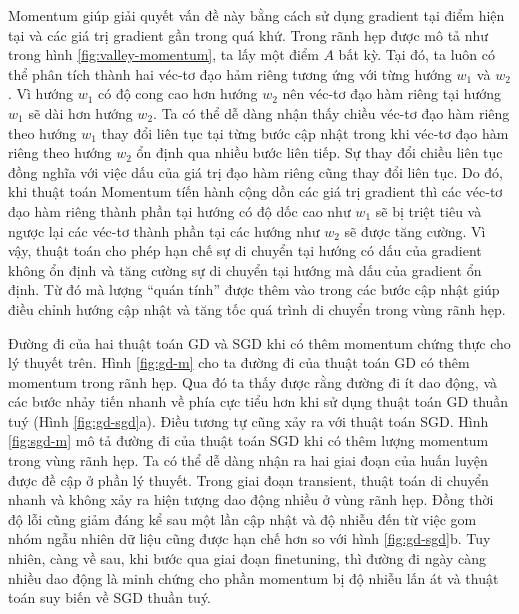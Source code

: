 Momentum giúp giải quyết vấn đề này bằng cách sử dụng gradient tại điểm hiện tại và các giá trị gradient gần trong quá khứ. Trong rãnh hẹp được mô tả như trong hình \ref{fig:valley-momentum}, ta lấy một điểm $A$ bất kỳ. Tại đó, ta luôn có thể phân tích thành hai véc-tơ đạo hảm riêng tương ứng với từng hướng $w_1$ và $w_2$. Vì hướng $w_1$ có độ cong cao hơn hướng $w_2$ nên véc-tơ đạo hàm riêng tại hướng $w_1$ sẽ dài hơn hướng $w_2$. Ta có thể dễ dàng nhận thấy chiều véc-tơ đạo hàm riêng theo hướng $w_1$ thay đổi liên tục tại từng bước cập nhật trong khi véc-tơ đạo hàm riêng theo hướng $w_2$ ổn định qua nhiều bước liên tiếp. Sự thay đổi chiều liên tục đồng nghĩa với việc dấu của giá trị đạo hàm riêng cũng thay đổi liên tục. Do đó, khi thuật toán Momentum tíến hành cộng dồn các giá trị gradient thì các véc-tơ đạo hàm riêng thành phần tại hướng có độ dốc cao như $w_1$ sẽ bị triệt tiêu và ngược lại các véc-tơ thành phần tại các hướng như $w_2$ sẽ được tăng cường. Vì vậy, thuật toán cho phép hạn chế sự di chuyển tại hướng có dấu của gradient không ổn định và tăng cường sự di chuyển tại hướng mà dấu của gradient ổn định. Từ đó mà lượng ``quán tính'' được thêm vào trong các bước cập nhật giúp điều chỉnh hướng cập nhật và tăng tốc quá trình di chuyển trong vùng rãnh hẹp.

Đường đi của hai thuật toán GD và SGD khi có thêm momentum chứng thực cho lý thuyết trên. Hình \ref{fig:gd-m} cho ta đường đi của thuật toán GD có thêm momentum trong rãnh hẹp. Qua đó ta thấy được rằng đường đi ít dao động, và các bước nhảy tiến nhanh về phía cực tiểu hơn khi sử dụng thuật toán GD thuần tuý (Hình \ref{fig:gd-sgd}a). Điều tương tự cũng xảy ra với thuật toán SGD. Hình \ref{fig:sgd-m} mô tả đường đi của thuật toán SGD khi có thêm lượng momentum trong vùng rãnh hẹp. Ta có thể dễ dàng nhận ra hai giai đoạn của huấn luyện được đề cập ở phần lý thuyết. Trong giai đoạn transient, thuật toán di chuyển nhanh và không xảy ra hiện tượng dao động nhiều ở vùng rãnh hẹp. Đồng thời độ lỗi cũng giảm đáng kể sau một lần cập nhật và độ nhiễu đến từ việc gom nhóm ngẫu nhiên dữ liệu cũng được hạn chế hơn so với hình \ref{fig:gd-sgd}b. Tuy nhiên, càng về sau, khi bước qua giai đoạn finetuning, thì đường đi ngày càng nhiều dao động là minh chứng cho phần momentum bị độ nhiễu lấn át và thuật toán suy biến về SGD thuần tuý.

